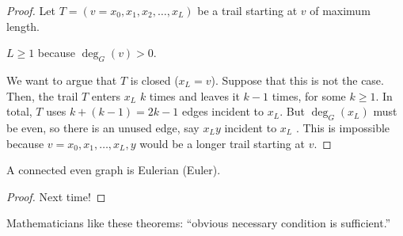 \begin{proof}
	Let \( T = (v=x_{0}, x_{1}, x_{2}, \ldots , x_L)\) be a trail starting at \( v \) of maximum length.
	\begin{note}
		\( L \ge 1 \) because \( \deg_G(v)>0 \).
	\end{note}
	We want to argue that \( T \) is closed (\( x_L=v \)). Suppose that this is not the case. Then, the trail \( T \) enters \( x_L \) \( k \) times and leaves it \( k-1 \) times, for some \( k\ge 1 \). In total, \( T \) uses \( k + (k-1)=2k-1 \) edges incident to \( x_L \). But \( \deg_G(x_L) \) must be even, so there is an unused edge, say \( x_Ly \) incident to \( x_L \) \contra. This is impossible because \( v=x_{0}, x_{1}, \ldots , x_L, y \) would be a longer trail starting at \( v \).
\end{proof}

\begin{theorem}
	A connected even graph is Eulerian (Euler).
\end{theorem}

\begin{proof}
	Next time!
\end{proof}

\begin{note}
	Mathematicians like these theorems: ``obvious necessary condition is sufficient.''
\end{note}
